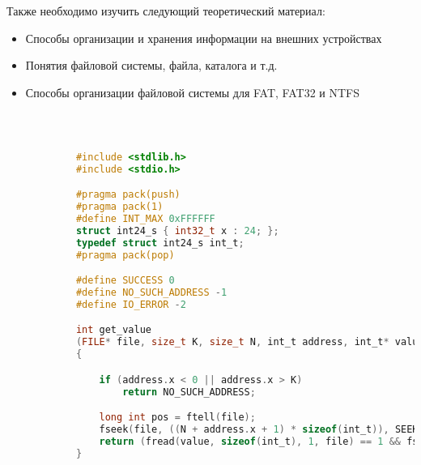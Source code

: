 \documentclass[a4paper,12pt]{article}
\begin{document}
\begin{flushleft}
        Также необходимо изучить следующий теоретический материал:
        \begin{itemize}
            \item Способы организации и хранения информации на внешних устройствах
            \item Понятия файловой системы, файла, каталога и т.д.
            \item Способы организации файловой системы для FAT, FAT32 и NTFS
        \end{itemize}
    
    \end{flushleft}
  
    \newpage

    \begin{flushleft}
         \\[0.5em]
        \begin{lstlisting}[language=c, 
                           breaklines=true, 
                           showtabs=false, 
                           showspaces=false, 
                           showstringspaces=false,
                           basicstyle=\ttfamily \footnotesize]
    
            #include <stdlib.h>
            #include <stdio.h>

            #pragma pack(push)
            #pragma pack(1)
            #define INT_MAX 0xFFFFFF
            struct int24_s { int32_t x : 24; };
            typedef struct int24_s int_t;
            #pragma pack(pop)

            #define SUCCESS 0
            #define NO_SUCH_ADDRESS -1
            #define IO_ERROR -2

            int get_value 
            (FILE* file, size_t K, size_t N, int_t address, int_t* value) 
            {

                if (address.x < 0 || address.x > K)
                    return NO_SUCH_ADDRESS;

                long int pos = ftell(file);
                fseek(file, ((N + address.x + 1) * sizeof(int_t)), SEEK_SET);
                return (fread(value, sizeof(int_t), 1, file) == 1 && fseek(file, pos, SEEK_SET) == 0) ? SUCCESS : IO_ERROR;
            }
      
        \end{lstlisting}
    \end{flushleft}
\end{document}
